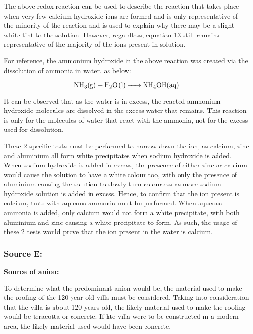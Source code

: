 \documentclass[11pt, a4]{article}
\begin{document}
				The above redox reaction can be used to describe the reaction that takes place when very few calcium hydroxide ions are formed and is only representative of the minority of the reaction and is used to explain why there may be a slight white tint to the solution. However, regardless, equation 13 still remains representative of the majority of the ions present in solution.

				For reference, the ammonium hydroxide in the above reaction was created via the dissolution of ammonia in water, as below:

				\begin{equation}
					\ce{NH_3{(g)} + H_2O(l) -> NH_4OH{(aq)}}
				\end{equation}

				It can be observed that as the water is in excess, the reacted ammonium hydroxide molecules are dissolved in the excess water that remains. This reaction is only for the molecules of water that react with the ammonia, not for the excess used for dissolution. 

				These 2 specific tests must be performed to narrow down the ion, as calcium, zinc and aluminium all form white precipitates when sodium hydroxide is added. When sodium hydroxide is added in excess, the presence of either zinc or calcium would cause the solution to have a white colour too, with only the presence of aluminium causing the solution to slowly turn colourless as more sodium hydroxide solution is added in excess. Hence, to confirm that the ion present is calcium, tests with aqueous ammonia must be performed. When aqueous ammonia is added, only calcium would not form a white precipitate, with both aluminium and zinc causing a white precipitate to form. As such, the usage of these 2 tests would prove that the ion present in the water is calcium.
			\subsubsection{Source E:}
								
			\textbf{Source of anion:}

				To determine what the predominant anion would be, the material used to make the roofing of the 120 year old villa must be considered. Taking into consideration that the villa is about 120 years old, the likely material used to make the roofing would be teracotta or concrete. If hte villa were to be constructed in a modern area, the likely material used would have been concrete. 
				
\end{document}
